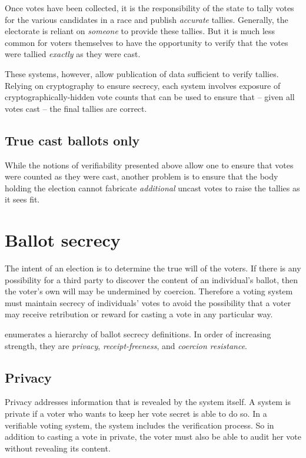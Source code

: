 \documentclass[10pt,twocolumn]{article}
\newcommand{\term}[1]{\textit{#1}}
\begin{document}
Once votes have been collected, it is the responsibility of the state to tally votes for the various
candidates in a race and publish \emph{accurate} tallies. Generally, the electorate is reliant on
\emph{someone} to provide these tallies. But it is much less common for voters themselves to have
the opportunity to verify that the votes were tallied \emph{exactly} as they were cast.

These systems, however, allow publication of data sufficient to verify tallies. Relying on
cryptography to ensure secrecy, each system involves exposure of cryptographically-hidden vote
counts that can be used to ensure that -- given all votes cast -- the final tallies are correct.

\subsection{True cast ballots only}

While the notions of verifiability presented above allow one to ensure that votes were counted as
they were cast, another problem is to ensure that the body holding the election cannot fabricate
\emph{additional} uncast votes to raise the tallies as it sees fit.

\section{Ballot secrecy}

The intent of an election is to determine the true will of the voters.
If there is any possibility for a third party to discover the content of
an individual's ballot, then the voter's own will may be undermined by coercion.
Therefore a voting system must maintain secrecy of individuals' votes to avoid
the possibility that a voter may receive retribution or reward for casting a vote
in any particular way.

\cite{delaune} enumerates a hierarchy of ballot secrecy definitions.
In order of increasing strength, they are
\term{privacy}, \term{receipt-freeness}, and \term{coercion resistance}.

\subsection{Privacy}

Privacy addresses information that is revealed by the system itself.
A system is private if a voter who wants to keep her vote secret is able to do so.
In a verifiable voting system, the system includes the verification process.
So in addition to casting a vote in private, the voter must also be able to
audit her vote without revealing its content.
\end{document}
